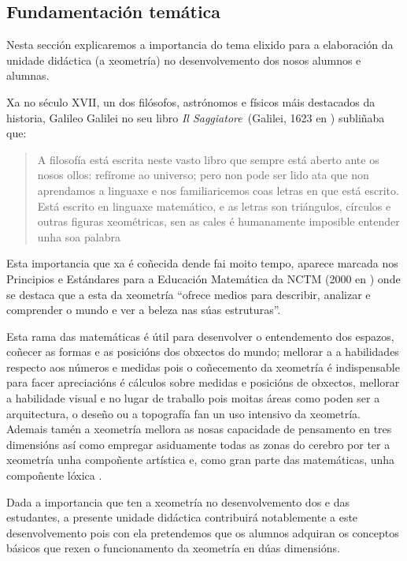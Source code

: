 \subsection{Fundamentación temática}

Nesta sección explicaremos a importancia do tema elixido para a elaboración da unidade didáctica (a xeometría) no desenvolvemento dos nosos alumnos e alumnas.

Xa no século XVII, un dos filósofos, astrónomos e físicos máis destacados da historia, Galileo Galilei no seu libro \emph{Il Saggiatore}~(Galilei, 1623 en ) subliñaba que:
\begin{quote}
\vspace{-0.3\baselineskip}
A filosofía está escrita neste vasto libro que sempre está aberto ante os nosos ollos: refírome ao universo; pero non pode ser lido ata que non aprendamos a linguaxe e nos familiaricemos coas letras en que está escrito. Está escrito en linguaxe matemático, e as letras son triángulos, círculos e outras figuras xeométricas, sen as cales é humanamente imposible entender unha soa palabra
\vspace{-0.6\baselineskip}
\end{quote}

Esta importancia que xa é coñecida dende fai moito tempo, aparece marcada nos Principios e Estándares para a Educación Matemática da NCTM (2000 en ) onde se destaca que a esta da xeometría ``ofrece medios para describir, analizar e comprender o mundo e ver a beleza nas súas estruturas''.

Esta rama das matemáticas é útil para desenvolver o entendemento dos espazos, coñecer as formas e as posicións dos obxectos do mundo; mellorar a a habilidades respecto aos números e medidas pois o coñecemento da xeometría é indispensable para facer apreciacións é cálculos sobre medidas e posicións de obxectos, mellorar a habilidade visual e no lugar de traballo pois moitas áreas como poden ser a arquitectura, o deseño ou a topografía fan un uso intensivo da xeometría. Ademais tamén a xeometría mellora as nosas capacidade de pensamento en tres dimensións así como empregar asiduamente todas as zonas do cerebro por ter a xeometría unha compoñente artística e, como gran parte das matemáticas, unha compoñente lóxica \cite{shockingreasons}.

Dada a importancia que ten a xeometría no desenvolvemento dos e das estudantes, a presente unidade didáctica contribuirá notablemente a este desenvolvemento pois con ela pretendemos que os alumnos adquiran os conceptos básicos que rexen o funcionamento da xeometría en dúas dimensións.
